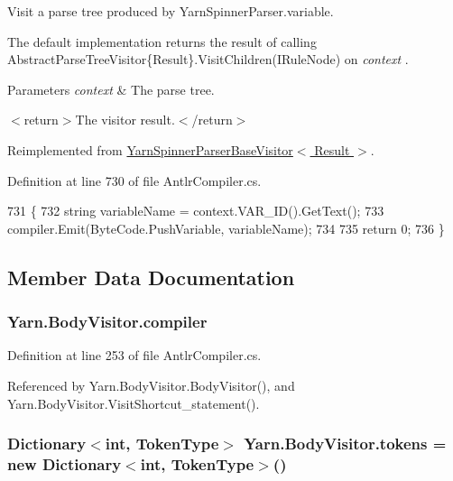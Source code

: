 Visit a parse tree produced by Yarn\-Spinner\-Parser.\-variable. 

The default implementation returns the result of calling Abstract\-Parse\-Tree\-Visitor\{\-Result\}.\-Visit\-Children(\-I\-Rule\-Node) on {\itshape context} . 


\begin{DoxyParams}{Parameters}
{\em context} & The parse tree.\\
\hline
\end{DoxyParams}
$<$return$>$The visitor result.$<$/return$>$ 

Reimplemented from \hyperlink{a00191_a51d3d21fc833b5b4676ac84a46cdef87}{Yarn\-Spinner\-Parser\-Base\-Visitor$<$ Result $>$}.



Definition at line 730 of file Antlr\-Compiler.\-cs.


\begin{DoxyCode}
731         \{
732             \textcolor{keywordtype}{string} variableName = context.VAR\_ID().GetText();
733             compiler.Emit(ByteCode.PushVariable, variableName);
734 
735             \textcolor{keywordflow}{return} 0;
736         \}
\end{DoxyCode}


\subsection{Member Data Documentation}
\hypertarget{a00038_a39d71c6de5e1c9f7d2f78ac2ccd5743d}{
\subsubsection[{compiler}]{ Yarn.\-Body\-Visitor.\-compiler\hspace{0.3cm}{\ttfamily [package]}}}\label{a00038_a39d71c6de5e1c9f7d2f78ac2ccd5743d}


Definition at line 253 of file Antlr\-Compiler.\-cs.



Referenced by Yarn.\-Body\-Visitor.\-Body\-Visitor(), and Yarn.\-Body\-Visitor.\-Visit\-Shortcut\-\_\-statement().

\hypertarget{a00038_ab8aa4dbe47a807e3d973df2b85e3fffc}{
\subsubsection[{tokens}]{\setlength{\rightskip}{0pt plus 5cm}Dictionary$<$int, {\bf Token\-Type}$>$ Yarn.\-Body\-Visitor.\-tokens = new Dictionary$<$int, {\bf Token\-Type}$>$()\hspace{0.3cm}{\ttfamily [private]}}}\label{a00038_ab8aa4dbe47a807e3d973df2b85e3fffc}



